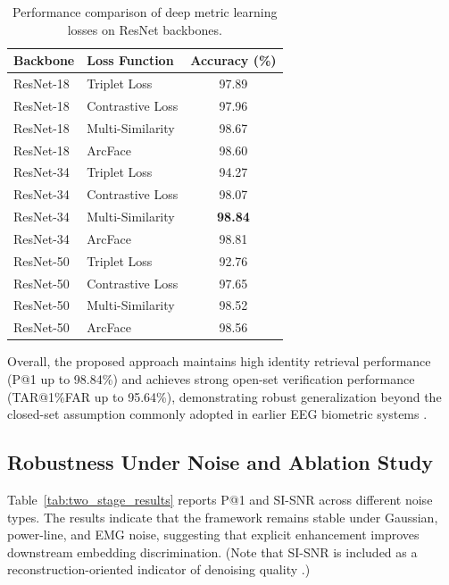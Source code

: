 \documentclass[a4paper,conference]{IEEEtran}
\begin{document}
	\begin{table}[htbp]
		\centering
		\caption{Performance comparison of deep metric learning losses on ResNet backbones.}
		\label{tab:dml_resnet}
		\begin{tabular}{l l c}
			\hline
			\textbf{Backbone} & \textbf{Loss Function} & \textbf{Accuracy (\%)} \\
			\hline
			ResNet-18 & Triplet Loss        & 97.89 \\
			ResNet-18 & Contrastive Loss    & 97.96 \\
			ResNet-18 & Multi-Similarity    & 98.67 \\
			ResNet-18 & ArcFace             & 98.60 \\
			\hline
			ResNet-34 & Triplet Loss        & 94.27 \\
			ResNet-34 & Contrastive Loss    & 98.07 \\
			ResNet-34 & Multi-Similarity    & \textbf{98.84} \\
			ResNet-34 & ArcFace             & 98.81 \\
			\hline
			ResNet-50 & Triplet Loss        & 92.76 \\
			ResNet-50 & Contrastive Loss    & 97.65 \\
			ResNet-50 & Multi-Similarity    & 98.52 \\
			ResNet-50 & ArcFace             & 98.56 \\
			\hline
		\end{tabular}
	\end{table}
	
	Overall, the proposed approach maintains high identity retrieval performance (P@1 up to 98.84\%) and achieves strong open-set verification performance (TAR@1\%FAR up to 95.64\%), demonstrating robust generalization beyond the closed-set assumption commonly adopted in earlier EEG biometric systems \cite{Zhang2017,Fallahi2023,Yang2022}.
	
	\subsection{Robustness Under Noise and Ablation Study}
	Table~\ref{tab:two_stage_results} reports P@1 and SI-SNR across different noise types. The results indicate that the framework remains stable under Gaussian, power-line, and EMG noise, suggesting that explicit enhancement improves downstream embedding discrimination. (Note that SI-SNR is included as a reconstruction-oriented indicator of denoising quality \cite{Luo2018}.)
	
\end{document}

